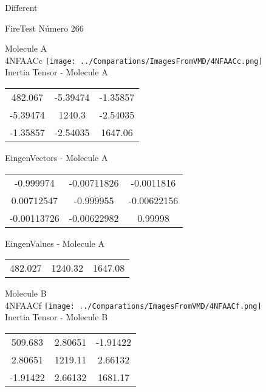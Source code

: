 \begin{center}
\vtab
\vtab
\textcolor{NavyBlue}{\Large Different}
\end{center}

 \newpage

\vtab[-2cm]
\begin{center}
{\large FireTest \tab Número 266}
\end{center}
\begin{multicols}{2}
\begin{center}

Molecule A \\ 
4NFAACc
\texttt{[image: ../Comparations/ImagesFromVMD/4NFAACc.png]}
\\
Inertia Tensor - Molecule A \\
\vtab

\begin{tabular}{|c c c|}
482.067	 & 	-5.39474	 & 	-1.35857	 \\
-5.39474	 & 	1240.3	 & 	-2.54035	 \\
-1.35857	 & 	-2.54035	 & 	1647.06
\end{tabular}

\vtab
 EingenVectors - Molecule A     \\
\vtab
\begin{tabular}{|c c c|}
-0.999974	 & 	-0.00711826	 & 	-0.0011816	 \\
0.00712547	 & 	-0.999955	 & 	-0.00622156	 \\
-0.00113726	 & 	-0.00622982	 & 	0.99998
\end{tabular}

\vtab
 EingenValues - Molecule A     \\
\vtab
\begin{tabular}{|c c c|}
482.027	 & 	1240.32	 & 	1647.08	 \\
\end{tabular}
\columnbreak

Molecule B \\ 
4NFAACf
\texttt{[image: ../Comparations/ImagesFromVMD/4NFAACf.png]}
\\
Inertia Tensor - Molecule B \\
\vtab

\begin{tabular}{|c c c|}
509.683	 & 	2.80651	 & 	-1.91422	 \\
2.80651	 & 	1219.11	 & 	2.66132	 \\
-1.91422	 & 	2.66132	 & 	1681.17
\end{tabular}


\end{center}
\end{multicols}
